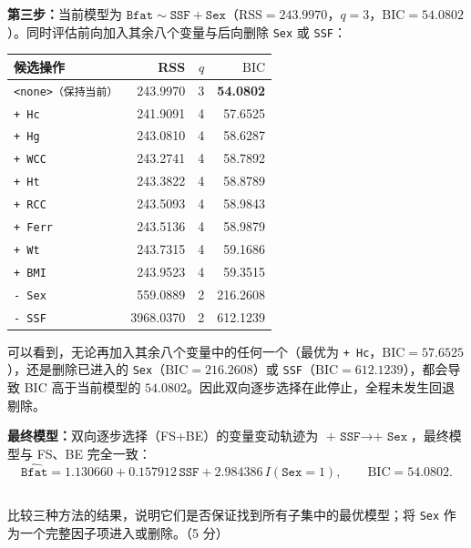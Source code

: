 \documentclass[12pt,a4paper]{article}
\begin{document}
\begin{answerbox}
\textbf{第三步：}当前模型为 $\texttt{Bfat}\sim\texttt{SSF}+\texttt{Sex}$（$\mathrm{RSS}=243.9970$，$q=3$，$\mathrm{BIC}=54.0802$）。同时评估前向加入其余八个变量与后向删除 \texttt{Sex} 或 \texttt{SSF}：
\begin{center}
\small
\begin{tabular}{lrrr}
\toprule
候选操作 & RSS & $q$ & $\mathrm{BIC}$ \\
\midrule
\texttt{<none>（保持当前）} & 243.9970 & 3 & \textbf{54.0802} \\
\texttt{+ Hc} & 241.9091 & 4 & 57.6525 \\
\texttt{+ Hg} & 243.0810 & 4 & 58.6287 \\
\texttt{+ WCC} & 243.2741 & 4 & 58.7892 \\
\texttt{+ Ht} & 243.3822 & 4 & 58.8789 \\
\texttt{+ RCC} & 243.5093 & 4 & 58.9843 \\
\texttt{+ Ferr} & 243.5136 & 4 & 58.9879 \\
\texttt{+ Wt} & 243.7315 & 4 & 59.1686 \\
\texttt{+ BMI} & 243.9523 & 4 & 59.3515 \\
\texttt{- Sex} & 559.0889 & 2 & 216.2608 \\
\texttt{- SSF} & 3968.0370 & 2 & 612.1239 \\
\bottomrule
\end{tabular}
\end{center}
可以看到，无论再加入其余八个变量中的任何一个（最优为 \texttt{+ Hc}，$\mathrm{BIC}=57.6525$），还是删除已进入的 \texttt{Sex}（$\mathrm{BIC}=216.2608$）或 \texttt{SSF}（$\mathrm{BIC}=612.1239$），都会导致 BIC 高于当前模型的 $54.0802$。因此双向逐步选择在此停止，全程未发生回退剔除。

\textbf{最终模型：}双向逐步选择（FS+BE）的变量变动轨迹为 $\texttt{+ SSF}\to\texttt{+ Sex}$，最终模型与 FS、BE 完全一致：
$$
\widehat{\texttt{Bfat}}=1.130660+0.157912\,\texttt{SSF}+2.984386\,I(\texttt{Sex}=1),\qquad \mathrm{BIC}=54.0802.
$$
\end{answerbox}

\subsection{}

比较三种方法的结果，说明它们是否保证找到所有子集中的最优模型；将 \texttt{Sex} 作为一个完整因子项进入或删除。（5 分）
\end{document}
